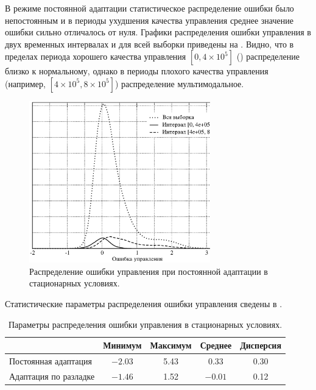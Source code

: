В режиме постоянной адаптации статистическое распределение ошибки было
непостоянным и в периоды ухудшения качества управления среднее
значение ошибки сильно отличалось от нуля.  Графики распределения
ошибки управления в двух временных интервалах и для всей выборки
приведены на .  Видно, что в
пределах периода хорошего качества управления $[0, 4\times10^5]$
() распределение близко к нормальному,
однако в периоды плохого качества управления (например, $[4\times10^5,
  8\times10^5]$) распределение мультимодальное.

\begin{figure}[h]
\centering
\includegraphics[width=0.7\textwidth,%
  height=0.3\textheight]{perm_adopt_distrib_rus}
\caption{Распределение ошибки управления при постоянной адаптации в
  стационарных условиях.}
\label{fig:perm_adopt_distrib_rus}
\end{figure}

Статистические параметры распределения ошибки управления сведены в
.

\begin{table}
  \caption{Параметры распределения ошибки управления в стационарных условиях.}
  \label{tabl:steady_state_distrib}
  \begin{tabular}{|l|c|c|c|c|}
    \hline
    & Минимум & Максимум & Среднее & Дисперсия\\
    \hline
    Постоянная адаптация&
    $-2.03$ & 5.43 & 0.33 & 0.30\\
    \hline
    Адаптация по разладке&
    $-1.46$ & 1.52 & $-0.01$ & 0.12\\
    \hline
  \end{tabular}
\end{table}

